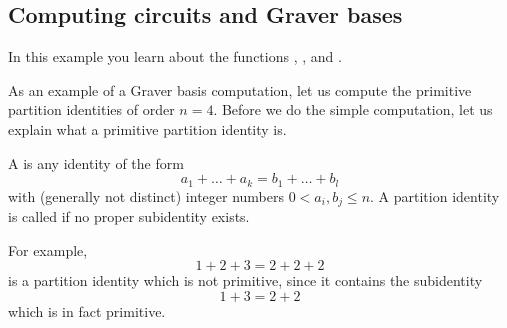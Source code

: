 \subsection{Computing circuits and Graver bases}

In this example you learn about the functions ,
, and .

As an example of a Graver basis computation, let us compute the
primitive partition identities of order $n=4$. Before we do the
simple computation, let us explain what a primitive partition
identity is.

A  is any identity of the form
\[
a_1+\ldots+a_k=b_1+\ldots+b_l
\]
with (generally not distinct) integer numbers $0<a_i,b_j\leq n$. A
partition identity is called  if no proper
subidentity exists.

For example,
\[
1+2+3=2+2+2
\]
is a partition identity which is not primitive, since it contains
the subidentity
\[
1+3=2+2
\]
which is in fact primitive.

